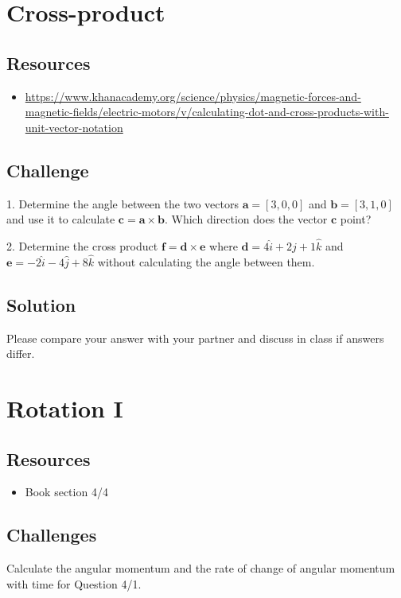 \newpage
\section{Cross-product}

\subsection*{Resources}
\begin{itemize}
    \item \url{https://www.khanacademy.org/science/physics/magnetic-forces-and-magnetic-fields/electric-motors/v/calculating-dot-and-cross-products-with-unit-vector-notation}
\end{itemize}


\subsection*{Challenge}
1. Determine the angle between the two vectors $\bm{a} = [3,0,0]$ and $\bm{b} = [3,1,0]$ and use it to calculate $\bm{c} = \bm{a} \times \bm{b}$. Which direction does the vector $\bm{c}$ point?

2. Determine the cross product $\bm{f} = \bm{d} \times \bm{e}$ where $\bm{d} = 4 \hat{i}+ 2 \hat{j} + 1 \hat{k}$ and $\bm{e} = -2 \hat{i} -4 \hat{j} + 8 \hat{k}$ without calculating the angle between them.

\subsection*{Solution}
Please compare your answer with your partner and discuss in class if answers differ.




\newpage
\section{Rotation I}

\subsection*{Resources}
\begin{itemize}
    \item Book section 4/4
\end{itemize}

\subsection*{Challenges}
Calculate the angular momentum and the rate of change of angular momentum with time for Question 4/1.

